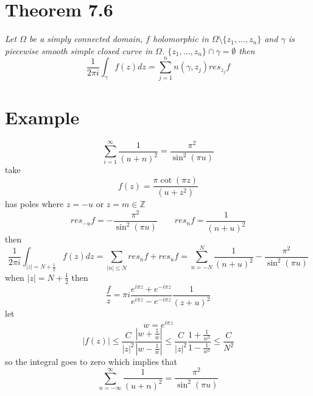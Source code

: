 \documentclass[11pt]{article}
\begin{document}
\section{Theorem 7.6}
\emph{
    Let $\Omega$ be a simply connected domain,  $f$ holomorphic in $\Omega \setminus \{z_1,\dots,z_n\}$ and $\gamma$ is piecewise smooth simple closed curve
    in $\Omega$.  $\{z_1,\dots,z_n\} \cap \gamma = \emptyset$ then
    \[
        \frac{1}{2\pi i} \int_{ \gamma}^{}f(z)dz = \sum_{j=1}^{n}n(\gamma,z_j) res_{z_j}f
    \]
}
\section{Example}
\[
\sum_{i=1}^{\infty}\frac{1}{(u+n)^2} = \frac{\pi^2}{\sin^2(\pi u)}
\]
take
\[
f(z) = \frac{\pi \cot(\pi z)}{(u+z^2)}
\]
has poles where $z = -u$ or  $z = m \in \mathbb{Z}$
\[
    res_{-u}f = -\frac{\pi^2}{\sin^2(\pi u)} \qquad res_{n}f = \frac{1}{(n+u)^2}
\]
then
\[
\frac{1}{2\pi i} \int_{ |z| = N +\frac{1}{2}}^{}f(z)dz = \sum_{|n| \le N}^{}res_n f + res_u f  = \sum_{n=-N}^{N}\frac{1}{(n+u)^2} - \frac{\pi^2}{\sin^2( \pi u)}
\]
when $|z| = N + \frac{1}{2}$ then
\[
\frac{f}{z} = \pi i \frac{e^{i \pi z} + e^{-i \pi z}}{e^{i\pi z} - e^{-i \pi z}} \frac{1}{(z+u)^2}
\]
let
\[
w = e^{i \pi z}
\]
\[
|f(z)| \le \frac{C}{|z|^2} \frac{|w + \frac{1}{w}|}{|w - \frac{1}{w}|} \le \frac{C}{|z|^2} \frac{1 + \frac{1}{w^2}}{1 - \frac{1}{w^2}} \le \frac{C}{N^2}
\]
so the integral goes to zero which implies that
\[
\sum_{n=-\infty}^{\infty}\frac{1}{(u+n)^2} = \frac{\pi^2}{\sin^2 (\pi u)}
\]
\end{document}

